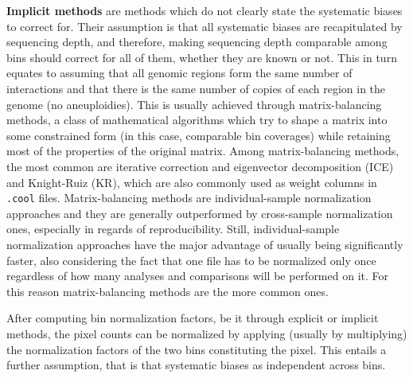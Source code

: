 \textbf{Implicit methods} are methods which do not clearly state the systematic biases to correct for. Their assumption is that all systematic biases are recapitulated by sequencing depth, and therefore, making sequencing depth comparable among bins should correct for all of them, whether they are known or not. This in turn equates to assuming that all genomic regions form the same number of interactions and that there is the same number of copies of each region in the genome (no aneuploidies). This is usually achieved through matrix-balancing methods, a class of mathematical algorithms which try to shape a matrix into some constrained form (in this case, comparable bin coverages) while retaining most of the properties of the original matrix. Among matrix-balancing methods, the most common are iterative correction and eigenvector decomposition (ICE)\cite{ice2012} and Knight-Ruiz (KR)\cite{knightruiz2012}, which are also commonly used as weight columns in \texttt{.cool} files. Matrix-balancing methods are individual-sample normalization approaches and they are generally outperformed by cross-sample normalization ones, especially in regards of reproducibility. Still, individual-sample normalization approaches have the major advantage of usually being significantly faster, also considering the fact that one file has to be normalized only once regardless of how many analyses and comparisons will be performed on it. For this reason matrix-balancing methods are the more common ones.

After computing bin normalization factors, be it through explicit or implicit methods, the pixel counts can be normalized by applying (usually by multiplying) the normalization factors of the two bins constituting the pixel. This entails a further assumption, that is that systematic biases as independent across bins.



